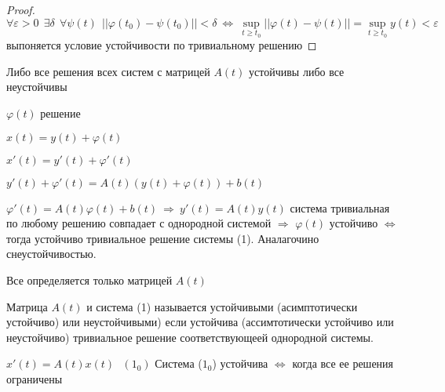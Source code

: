 \begin{proof}
  $$
  \forall \varepsilon > 0 ~~ \exists \delta ~~ \forall \psi(t) ~~
  ||\varphi(t_0) - \psi(t_0)|| < \delta ~ \Leftrightarrow ~ \sup_{t \ge t_0}
  ||\varphi(t) - \psi(t)|| = \sup_{t \ge t_0} y(t) < \varepsilon
  $$
  выпоняется условие устойчивости по тривиальному решению
\end{proof}

\begin{block}[Утверждение]
  Либо все решения всех систем с матрицей $A(t)$ устойчивы либо все неустойчивы

  $\varphi(t)$ решение

  $x(t) = y(t) + \varphi(t)$

  $x'(t) = y'(t) + \varphi'(t)$

  $y'(t) + \varphi'(t) = A(t)(y(t) + \varphi(t)) + b(t)$

  $\varphi'(t) = A(t)\varphi(t) + b(t) ~ \Rightarrow ~ y'(t) = A(t)y(t)$
  система тривиальная по любому решению совпадает с однородной системой
  $\Rightarrow$ $\varphi(t)$ устойчиво $\Leftrightarrow$ тогда устойчиво
  тривиальное решение системы (1). Аналагочино снеустойчивостью.

  Все определяется только матрицей $A(t)$
\end{block}

\begin{define}
  Матрица $A(t)$ и система (1) называется устойчивыми (асимптотически устойчиво)
  или неустойчивыми) если устойчива (ассимтотически устойчиво или неустойчиво)
  тривиальное решение соответствующеей однородной системы.
\end{define}

\begin{block}[Утверждение 1]
  $x'(t) = A(t)x(t) ~~~ (1_0)$
  Система ($1_0$) устойчива $\Leftrightarrow$ когда все ее решения ограничены
\end{block}

